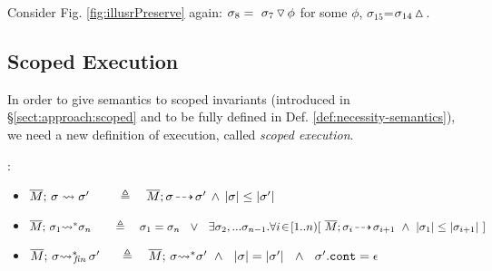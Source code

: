 Consider Fig. \ref{fig:illusrPreserve}  again: $\sigma_8 =  \ {\sigma_7} \, {\triangledown}\, {\phi} $ for some $\phi$,   $\sigma_{15}$=$\sigma_{14} \, {\vartriangle}\,$.

 
 \subsection{Scoped Execution}
 \label{sect:bounded}


In order to give semantics to scoped invariants (introduced in \S  \ref{sect:approach:scoped} and to be fully defined  in Def.  \ref{def:necessity-semantics}), we need a new definition of execution, called \emph{scoped execution}. 

 
 \renewcommand{\EarlierS}[2]{\DepthSt{#1} \leq \DepthSt{#2}}
 \renewcommand{\NotEarlierS}[2]{\DepthSt{#1} \not\leq \DepthSt{#2}} 
 
\begin{definition}:
\label{def:shallow:term}
 
\begin{itemize}

  \item
{  $\leadstoBounded  {\Mtwo} {\sigma}   {\sigma'} \ \ \   \,   \ \ \ \triangleq \ \ \  \leadstoOrig {\Mtwo} {\sigma} {\sigma'} \, \wedge\, 
 \EarlierS {\sigma}  {\sigma'} $}
  \item
{  $\leadstoBoundedStar {\Mtwo}  {\sigma_1}  {\sigma_n}  \ \ \,  \ \    \ \triangleq  \ \ \  {\sigma_1} = {\sigma_n}\ \ \vee \ \  \exists \sigma_2,...\sigma_{n-1}.\forall i\!\in\! [1..n)[\  \leadstoOrig {\Mtwo}  {\sigma_i}  {\sigma_{i+1}}\  \wedge\  \EarlierS{\sigma_1} {\sigma_{i+1}} \ ]$ }
\item
  $\leadstoBoundedStarFin {\Mtwo}  {\sigma}  {\sigma'}  \  \,  \ \  \ \triangleq  \ \ \  \leadstoBoundedStar {\Mtwo}  {\sigma}  {\sigma'}  \ \wedge\ \
 {\DepthFs \sigma = \DepthFs {\sigma'} \ \ \wedge \ \ \sigma'.\prg{cont}=\epsilon  } $
 \end{itemize}
\end{definition}



